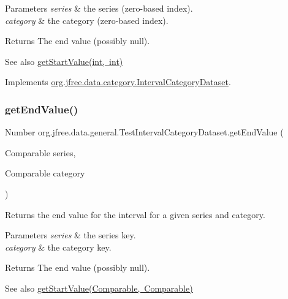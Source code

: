 \begin{DoxyParams}{Parameters}
{\em series} & the series (zero-\/based index). \\
\hline
{\em category} & the category (zero-\/based index).\\
\hline
\end{DoxyParams}
\begin{DoxyReturn}{Returns}
The end value (possibly {\ttfamily null}).
\end{DoxyReturn}
\begin{DoxySeeAlso}{See also}
\mbox{\hyperlink{classorg_1_1jfree_1_1data_1_1general_1_1_test_interval_category_dataset_a53688ff9ac8176c9262fffe32280f470}{get\+Start\+Value(int, int)}} 
\end{DoxySeeAlso}


Implements \mbox{\hyperlink{interfaceorg_1_1jfree_1_1data_1_1category_1_1_interval_category_dataset_af83cb9f655ea175391fed773b2e478cb}{org.\+jfree.\+data.\+category.\+Interval\+Category\+Dataset}}.

\mbox{\label{classorg_1_1jfree_1_1data_1_1general_1_1_test_interval_category_dataset_a595f5ee7d09a4215b9e0b006161894c9}} 
\subsubsection{\texorpdfstring{get\+End\+Value()}{getEndValue()}\hspace{0.1cm}{\footnotesize\ttfamily [2/2]}}
{\footnotesize\ttfamily Number org.\+jfree.\+data.\+general.\+Test\+Interval\+Category\+Dataset.\+get\+End\+Value (\begin{DoxyParamCaption}\item[{Comparable}]{series,  }\item[{Comparable}]{category }\end{DoxyParamCaption})}

Returns the end value for the interval for a given series and category.


\begin{DoxyParams}{Parameters}
{\em series} & the series key. \\
\hline
{\em category} & the category key.\\
\hline
\end{DoxyParams}
\begin{DoxyReturn}{Returns}
The end value (possibly {\ttfamily null}).
\end{DoxyReturn}
\begin{DoxySeeAlso}{See also}
\mbox{\hyperlink{classorg_1_1jfree_1_1data_1_1general_1_1_test_interval_category_dataset_ae3ea72c7a63af5350adc3eb94ac6d006}{get\+Start\+Value(\+Comparable, Comparable)}} 
\end{DoxySeeAlso}


